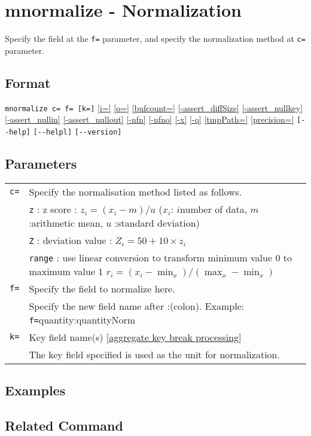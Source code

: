 
%

\section{mnormalize - Normalization\label{sect:mnormalize}}

Specify the field at the \verb|f=| parameter, and specify the normalization method at \verb|c=| parameter.\\

\subsection*{Format}
\verb|mnormalize c= f= [k=]| 
\hyperref[sect:option_i]{[i=]}
\hyperref[sect:option_o]{[o=]}
\hyperref[sect:option_bufcount]{[bufcount=]} 
\hyperref[sect:option_assert_diffSize]{[-assert\_diffSize]}
\hyperref[sect:option_assert_nullkey]{[-assert\_nullkey]}
\hyperref[sect:option_assert_nullin]{[-assert\_nullin]}
\hyperref[sect:option_assert_nullout]{[-assert\_nullout]}
\hyperref[sect:option_nfn]{[-nfn]} 
\hyperref[sect:option_nfno]{[-nfno]}  
\hyperref[sect:option_x]{[-x]}
\hyperref[sect:option_q]{[-q]}
\hyperref[sect:option_option_tmppath]{[tmpPath=]}
\hyperref[sect:option_precision]{[precision=]}
\verb|[--help]|
\verb|[--helpl]|
\verb|[--version]|\\

\subsection*{Parameters}
\begin{table}[htbp]
{\small
\begin{tabular}{ll}
\verb|c=|    & Specify the normalisation method listed as follows.\\
             & \verb|z| : z score : $z_i=(x_i-m)/u$ ($x_i$: $i$number of data, $m$ :arithmetic mean, $u$ :standard deviation)\\
             & \verb|Z| : deviation value : $Z_i=50+10\times z_i$\\
             & \verb|range| : use linear conversion to transform minimum value 0 to maximum value 1 $r_i=(x_i-\min_x)/(\max_x-\min_x)$\\
\verb|f=|    & Specify the field to normalize here. \\
             & Specify the new field name after :(colon). Example: \verb|f=|quantity:quantityNorm\\
\verb|k=|    & Key field name(s) [\hyperref[sect:option_k]{aggregate key break processing}]\\
             & The key field specified is used as the unit for normalization. \\
\end{tabular} 
}
\end{table} 

\subsection*{Examples}

\subsection*{Related Command}

%
